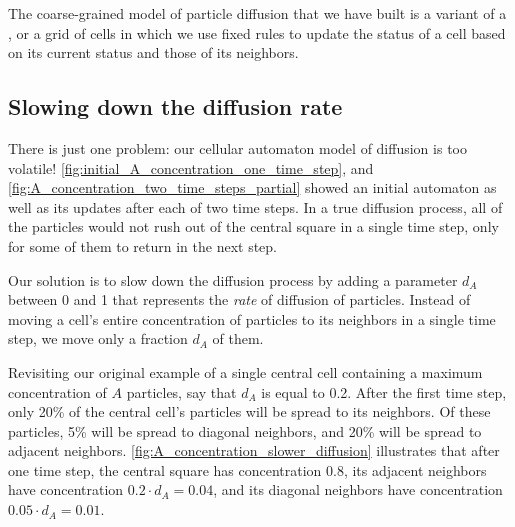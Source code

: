 \begin{qbox}\end{qbox}

The coarse-grained model of particle diffusion that we have built is a variant of a , or a grid of cells in which we use fixed rules to update the status of a cell based on its current status and those of its neighbors.\\

\begin{note}\end{note}

\FloatBarrier
{}
\subsection{Slowing down the diffusion rate}

There is just one problem: our cellular automaton model of diffusion is too volatile! 
\autoref{fig:initial_A_concentration_one_time_step}, and
\autoref{fig:A_concentration_two_time_steps_partial} showed an initial automaton as well as its updates after each of two time steps. In a true diffusion process, all of the particles would not rush out of the central square in a single time step, only for some of them to return in the next step.

Our solution is to slow down the diffusion process by adding a parameter $d_A$ between 0 and 1 that represents the \textit{rate} of diffusion of  particles. Instead of moving a cell's entire concentration of particles to its neighbors in a single time step, we move only a fraction $d_A$ of them.

Revisiting our original example of a single central cell containing a maximum concentration of $A$ particles, say that $d_A$ is equal to 0.2. After the first time step, only 20\% of the central cell's particles will be spread to its neighbors. Of these particles, 5\% will be spread to diagonal neighbors, and 20\% will be spread to adjacent neighbors. \autoref{fig:A_concentration_slower_diffusion} illustrates that after one time step, the central square has concentration 0.8, its adjacent neighbors have concentration $0.2 \cdot d_A = 0.04$, and its diagonal neighbors have concentration $0.05 \cdot d_A = 0.01$.\\

